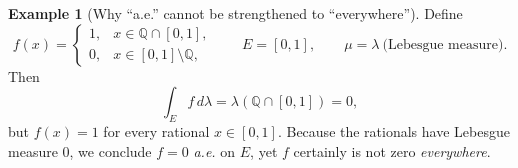 \documentclass[12pt]{article}
\theoremstyle{definition} %
\newtheorem{example}{Example}
\theoremstyle{plain} %
\begin{document}
\begin{example}[Why ``a.e.'' cannot be strengthened to ``everywhere'']
  Define
  \[
      f(x)=
      \begin{cases}
          1, & x\in \mathbb{Q}\cap[0,1],\\[4pt]
          0, & x\in[0,1]\setminus\mathbb{Q},
      \end{cases}
      \qquad
      E=[0,1], 
      \qquad
      \mu=\lambda\ \text{(Lebesgue measure).}
  \]
  Then
  \[
      \int_E f\,d\lambda
      =\lambda(\mathbb{Q}\cap[0,1]) = 0,
  \]
  but $f(x)=1$ for every rational $x\in[0,1]$.  
  Because the rationals have Lebesgue measure\/ $0$, we conclude
  $f=0$ \emph{a.e.} on $E$, yet $f$ certainly is not zero
  \emph{everywhere}.
\end{example}

\begin{center}
  \hrulefill
\end{center}
\end{document}
